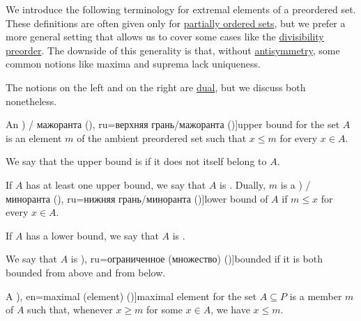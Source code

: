 \begin{definition}\label{def:extremal_points}
  We introduce the following terminology for extremal elements of a preordered set. These definitions are often given only for \hyperref[def:partially_ordered_set]{partially ordered sets}, but we prefer a more general setting that allows us to cover some cases like the \hyperref[thm:semiring_divisibility_order]{divisibility preorder}. The downside of this generality is that, without \hyperref[def:binary_relation/antisymmetric]{antisymmetry}, some common notions like maxima and suprema lack uniqueness.

  The notions on the left and on the right are \hyperref[thm:preorder_duality]{dual}, but we discuss both nonetheless.

  \begin{thmenum}
    \begin{TwoColumns}
      An \term[bg=горна граница (\cite[18]{Тагамлицки1971Диф}) / мажоранта (\cite[10]{Проданов1982}), ru=верхняя грань/мажоранта (\cite[def. 3.8]{Гуров2013})]{upper bound} for the set \( A \) is an element \( m \) of the ambient preordered set such that \( x \leq m \) for every \( x \in A \).

      We say that the upper bound is  if it does not itself belong to \( A \).

      If \( A \) has at least one upper bound, we say that \( A \) is .
    \BeginSecondColumn
      Dually, \( m \) is a \term[bg=долна граница (\cite[18]{Тагамлицки1971Диф}) / миноранта (\cite[10]{Проданов1982}), ru=нижняя грань/миноранта (\cite[def. 3.8]{Гуров2013})]{lower bound} of \( A \) if \( m \leq x \) for every \( x \in A \).

      If \( A \) has a lower bound, we say that \( A \) is .

      We say that \( A \) is \term[bg=ограничено (множество) (\cite[19]{Тагамлицки1971Диф}), ru=ограниченное (множество) (\cite[39]{Зорич2019Том1})]{bounded} if it is both bounded from above and from below.
    \end{TwoColumns}

    \mimprovised
    \begin{TwoColumns}
      A \term[ru=максимальный (елемент) (\cite[def. 3.6]{Гуров2013}), en=maximal (element) (\cite[33]{Harzheim2005})]{maximal element} for the set \( A \subseteq P \) is a member \( m \) of \( A \) such that, whenever \( x \geq m \) for some \( x \in A \), we have \( x \leq m \).


\end{TwoColumns}
\end{thmenum}
\end{definition}
